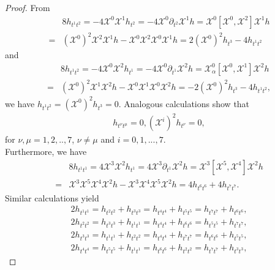 \documentclass[reqno,12pt]{amsart}
\numberwithin{equation}{section}
\theoremstyle{plain}
\theoremstyle{definition}
\begin{document}
\begin{proof}

From
    \begin{align*}
        &8h_{t^1t^2}=-4\mathscr{X}^0\mathscr{X}^1 h_{t^2}=-4\mathscr{X}^0\partial_{t^2}\mathscr{X}^1 h=\mathscr{X}^0[\mathscr{X}^0,\mathscr{X}^2]\mathscr{X}^1 h\\=&(\mathscr{X}^0)^2\mathscr{X}^2\mathscr{X}^1 h-\mathscr{X}^0\mathscr{X}^2\mathscr{X}^0\mathscr{X}^1 h =2(\mathscr{X}^0)^2h_{t^3}-4h_{t^1t^2}
        \end{align*}
and 
 \begin{align*}
&8h_{t^1t^2}=-4\mathscr{X}^0\mathscr{X}^2h_{t^1}=-4\mathscr{X}^0\partial_{t^1}\mathscr{X}^2 h=\mathscr{X}^0_\alpha[\mathscr{X}^0,\mathscr{X}^1]\mathscr{X}^2 h\\=&(\mathscr{X}^0)^2\mathscr{X}^1\mathscr{X}^2 h-\mathscr{X}^0\mathscr{X}^1\mathscr{X}^0\mathscr{X}^2 h =-2(\mathscr{X}^0)^2h_{t^3}-4h_{t^1t^2},
        \end{align*}
we have $h_{t^1t^2}=(\mathscr{X}^0)^2h_{t^3}=0$. Analogous calculations show that
\begin{align}\label{4.8}
    h_{t^\nu t^{\mu}}=0, (\mathscr{X}^i)^2h_{t^\nu}=0,
\end{align}
  for $\nu,\mu=1,2,..,7$, $\nu\neq \mu$ and $i=0,1,...,7$.\\
  Furthermore, we have
 \small{\begin{align*}
      &8h_{t^1t^1}=4\mathscr{X}^3\mathscr{X}^2 h_{t^1}=4\mathscr{X}^3\partial_{t^1}\mathscr{X}^2 h=\mathscr{X}^3[\mathscr{X}^5,\mathscr{X}^4]\mathscr{X}^2h\\=&\mathscr{X}^3\mathscr{X}^5\mathscr{X}^4\mathscr{X}^2 h-\mathscr{X}^3\mathscr{X}^4\mathscr{X}^5\mathscr{X}^2h=4h_{t^6t^6}+4h_{t^7t^7}.  \end{align*}}
      Similar calculations yield
    \small{\begin{align*}
2h_{t^1t^1}=h_{t^2t^2}+h_{t^3t^3}=h_{t^4t^4}+h_{t^5t^5}=h_{t^7t^7}+h_{t^6t^6},
      \end{align*}
 \begin{align*}
2h_{t^2t^2}=h_{t^3t^3}+h_{t^1t^1}=h_{t^4t^4}+h_{t^6t^6}=h_{t^5t^5}+h_{t^7t^7},
      \end{align*}
 \begin{align*}
2h_{t^3t^3}=h_{t^1t^1}+h_{t^2t^2}=h_{t^4t^4}+h_{t^7t^7}=h_{t^6t^6}+h_{t^5t^5},
      \end{align*}
 \begin{align*}
          2h_{t^4t^4}=h_{t^5t^5}+h_{t^1t^1}=h_{t^6t^6}+h_{t^2t^2}=h_{t^7t^7}+h_{t^3t^3},

\end{align*}}
\end{proof}
\end{document}
